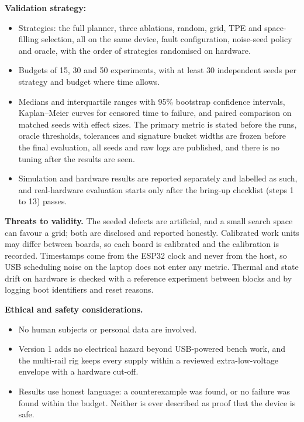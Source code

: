 \documentclass[12pt,a4paper]{article}
\begin{document}
\textbf{Validation strategy:}
\begin{itemize}
\item\relax Strategies: the full planner, three ablations, random, grid, TPE and space-filling selection, all on the same device, fault configuration, noise-seed policy and oracle, with the order of strategies randomised on hardware.
\item\relax Budgets of 15, 30 and 50 experiments, with at least 30 independent seeds per strategy and budget where time allows.
\item\relax Medians and interquartile ranges with 95\% bootstrap confidence intervals, Kaplan--Meier curves for censored time to failure, and paired comparison on matched seeds with effect sizes. The primary metric is stated before the runs, oracle thresholds, tolerances and signature bucket widths are frozen before the final evaluation, all seeds and raw logs are published, and there is no tuning after the results are seen.
\item\relax Simulation and hardware results are reported separately and labelled as such, and real-hardware evaluation starts only after the bring-up checklist (steps 1 to 13) passes.
\end{itemize}

\textbf{Threats to validity.} The seeded defects are artificial, and a small search space can favour a grid; both are disclosed and reported honestly. Calibrated work units may differ between boards, so each board is calibrated and the calibration is recorded. Timestamps come from the ESP32 clock and never from the host, so USB scheduling noise on the laptop does not enter any metric. Thermal and state drift on hardware is checked with a reference experiment between blocks and by logging boot identifiers and reset reasons.

\textbf{Ethical and safety considerations.}
\begin{itemize}
\item\relax No human subjects or personal data are involved.
\item\relax Version 1 adds no electrical hazard beyond USB-powered bench work, and the multi-rail rig keeps every supply within a reviewed extra-low-voltage envelope with a hardware cut-off.
\item\relax Results use honest language: a counterexample was found, or no failure was found within the budget. Neither is ever described as proof that the device is safe.
\end{itemize}
\end{document}
